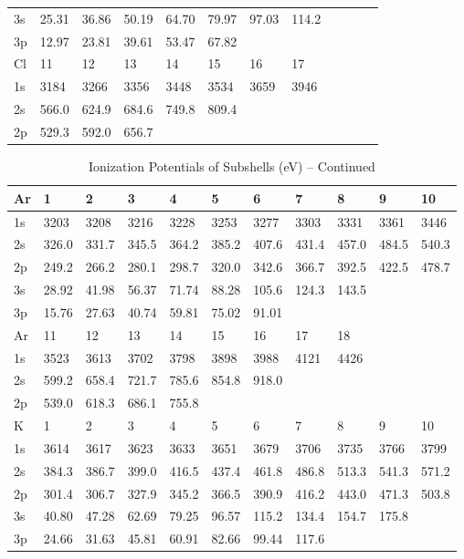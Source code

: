 \begin{table}
\begin{center}
\begin{tabular}{llllllllllll}
3s&
25.31& 36.86& 50.19& 64.70& 79.97& 97.03& 114.2\\
3p& 12.97& 23.81& 39.61& 53.47& 67.82\\
\hline
Cl&
11&  12&  13&  14&  15&  16&  17\\
\hline
1s&  3184&  3266&  3356&  3448&  3534&  3659&  3946\\
2s&
566.0& 624.9& 684.6& 749.8& 809.4\\
2p& 529.3& 592.0& 656.7\\
\hline
\end{tabular}
\end{center}
\end{table}


\begin{table}
\begin{center}
\addtocounter{table}{-1}
\caption{Ionization Potentials of Subshells (eV) -- Continued}
\begin{tabular}{lllllllllll}
\hline
Ar&   1&   2&   3&   4&   5&   6&   7&   8&   9&  10\\
\hline
1s& 3203&  3208&  3216&  3228&  3253&
3277&  3303&  3331&  3361&  3446\\
2s& 326.0& 331.7& 345.5& 364.2& 385.2& 407.6& 431.4&
457.0& 484.5& 540.3\\
2p& 249.2& 266.2& 280.1& 298.7& 320.0& 342.6& 366.7& 392.5& 422.5&
478.7\\
3s& 28.92& 41.98& 56.37& 71.74& 88.28& 105.6& 124.3& 143.5\\
3p& 15.76& 27.63& 40.74&
59.81& 75.02& 91.01\\
\hline
Ar&  11&  12&  13&  14&  15&  16&  17& 18\\
\hline
1s& 3523& 3613& 3702&
3798&  3898&  3988&  4121&  4426\\
2s& 599.2& 658.4& 721.7& 785.6& 854.8& 918.0\\
2p& 539.0&
618.3& 686.1& 755.8\\
\hline
K&    1&   2&   3&   4&   5&   6&   7&   8&   9&  10\\
\hline
1s&  3614&  3617&
3623&  3633&  3651&  3679&  3706&  3735&  3766& 3799\\
2s& 384.3& 386.7& 399.0& 416.5&
437.4& 461.8& 486.8& 513.3& 541.3& 571.2\\
2p& 301.4& 306.7& 327.9& 345.2& 366.5& 390.9&
416.2& 443.0& 471.3& 503.8\\
3s& 40.80& 47.28& 62.69& 79.25& 96.57& 115.2& 134.4& 154.7&
175.8\\
3p& 24.66& 31.63& 45.81& 60.91& 82.66& 99.44& 117.6\\

\end{tabular}
\end{center}
\end{table}
